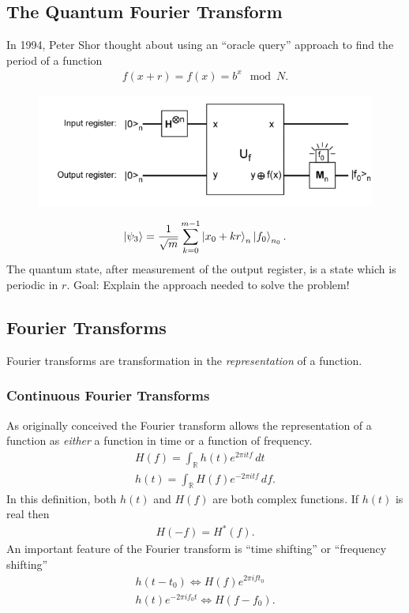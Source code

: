 \documentclass{book}
\theoremstyle{definition}
\newcommand{\nn}{\nonumber}
\newcommand{\f}[2]{\frac{#1}{#2}}
\begin{document}
\subsection{The Quantum Fourier Transform}
In 1994, Peter Shor thought about using an ``oracle query''
approach to find the period of a function 
\begin{align}
f(x+r) = f(x) = b^x \mod N.
\end{align}
\begin{figure}[!htb]
	\centering
	\includegraphics[scale=0.5]{shor6}
\end{figure}
\begin{align}
\ket{\psi_3} = \f{1}{\sqrt{m}}\sum^{m-1}_{k=0} \ket{x_0 + kr}_n \ket{f_0}_{n_0}.
\end{align}
The quantum state, after measurement of the output register, is
a state which is periodic in $r$. Goal: Explain the approach needed to solve the problem!


\subsection{Fourier Transforms}

Fourier transforms are transformation in the \textit{representation} of a function. 

\subsubsection{Continuous Fourier Transforms}

As originally conceived the Fourier transform allows the representation of a
function as \textit{either} a function in time or a function of frequency. 
\begin{align}
H(f) = \int_\mathbb{R} h(t) e^{2\pi i t f}\,dt\nn\\
h(t) = \int_\mathbb{R} H(f) e^{- 2\pi i  t f}\,df .
\end{align}
In this definition, both $h(t)$ and $H(f)$ are both complex functions. If $h(t)$ is real then 
\begin{align}
H(-f) = H^*(f).
\end{align}
An important feature of the Fourier transform is ``time shifting'' or ``frequency shifting''
\begin{align}
h(t - t_0) \iff H(f)e^{2\pi i ft_0}\nn\\
h(t)e^{-2\pi i f_0 t} \iff H(f - f_0).
\end{align}
\end{document}

